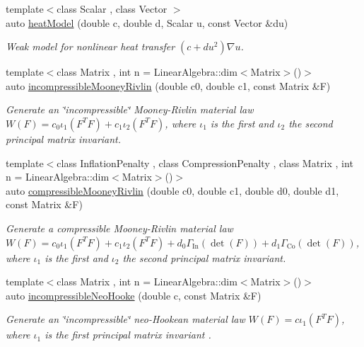 \begin{DoxyCompactItemize}
{\footnotesize template$<$class Scalar , class Vector $>$ }\\auto \hyperlink{namespaceFunG_aab17a1468e61f58564333b3fcd7900d6}{heat\-Model} (double c, double d, \-Scalar u, const \-Vector \&du)
\begin{DoxyCompactList}\small\item\em \-Weak model for nonlinear heat transfer $ (c+du^2)\nabla u $. \end{DoxyCompactList}\item 
{\footnotesize template$<$class Matrix , int n = \-Linear\-Algebra\-::dim$<$\-Matrix$>$()$>$ }\\auto \hyperlink{group__Rubber_gace19173e33490aadd36ae3a03fd1d85c}{incompressible\-Mooney\-Rivlin} (double c0, double c1, const \-Matrix \&\-F)
\begin{DoxyCompactList}\small\item\em \-Generate an \char`\"{}incompressible\char`\"{} \-Mooney-\/\-Rivlin material law $ W(F)=c_0\iota_1(F^T F) + c_1\iota_2(F^T F) $, where $\iota_1$ is the first and $\iota_2$ the second principal matrix invariant. \end{DoxyCompactList}\item 
{\footnotesize template$<$class Inflation\-Penalty , class Compression\-Penalty , class Matrix , int n = \-Linear\-Algebra\-::dim$<$\-Matrix$>$()$>$ }\\auto \hyperlink{group__Rubber_ga9a1894daa10a0bdcc620c6c41ecb6f19}{compressible\-Mooney\-Rivlin} (double c0, double c1, double d0, double d1, const \-Matrix \&\-F)
\begin{DoxyCompactList}\small\item\em \-Generate a compressible \-Mooney-\/\-Rivlin material law $ W(F)=c_0\iota_1(F^T F) + c_1\iota_2(F^T F) + d_0\Gamma_\mathrm{In}(\det(F))+d_1\Gamma_\mathrm{Co}(\det(F)) $, where $\iota_1$ is the first and $\iota_2$ the second principal matrix invariant. \end{DoxyCompactList}\item 
{\footnotesize template$<$class Matrix , int n = \-Linear\-Algebra\-::dim$<$\-Matrix$>$()$>$ }\\auto \hyperlink{group__Rubber_ga5bb28aef7006413775791998936d6b81}{incompressible\-Neo\-Hooke} (double c, const \-Matrix \&\-F)
\begin{DoxyCompactList}\small\item\em \-Generate an \char`\"{}incompressible\char`\"{} neo-\/\-Hookean material law $ W(F)=c\iota_1(F^T F) $, where $\iota_1$ is the first principal matrix invariant . \end{DoxyCompactList}\item 

\end{DoxyCompactItemize}
